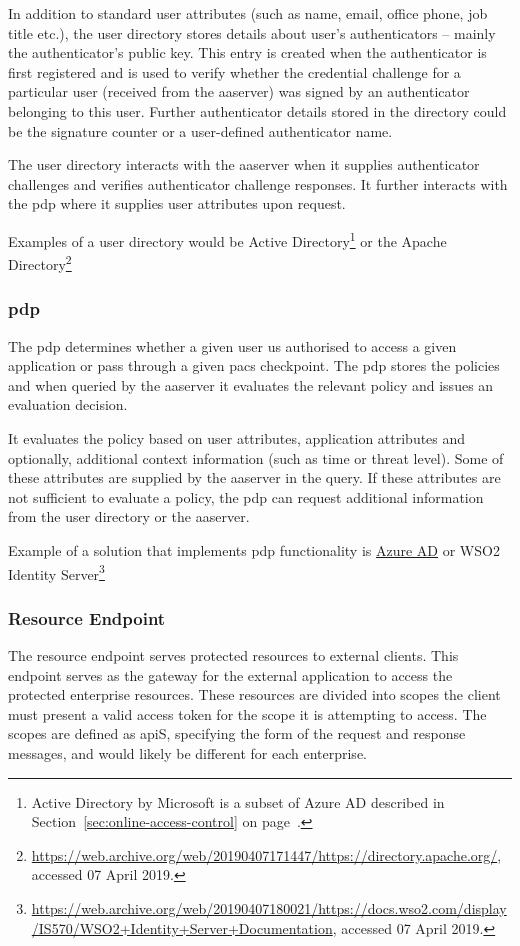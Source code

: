 In addition to standard user attributes (such as name, email, office phone, job title etc.), the user directory stores details about user's authenticators -- mainly the authenticator's public key. This entry is created when the authenticator is first registered and is used to verify whether the credential challenge for a particular user (received from the \acrshort{aaserver}) was signed by an authenticator belonging to this user. Further authenticator details stored in the directory could be the signature counter or a user-defined authenticator name.

The user directory interacts with the \acrshort{aaserver} when it supplies authenticator challenges and verifies authenticator challenge responses. It further interacts with the \acrshort{pdp} where it supplies user attributes upon request.

Examples of a user directory would be Active Directory\footnote{Active Directory by Microsoft is a subset of Azure AD described in Section~\ref{sec:online-access-control} on page~\pageref{sec:online-access-control}.} or the Apache Directory\footnote{\url{https://web.archive.org/web/20190407171447/https://directory.apache.org/}, accessed 07 April 2019.}
    
\subsubsection{\acrlong{pdp}}
The \acrfull{pdp} determines whether a given user us authorised to access a given application or pass through a given \acrshort{pacs} checkpoint. The \acrshort{pdp} stores the policies and when queried by the \acrshort{aaserver} it evaluates the relevant policy and issues an evaluation decision.

It evaluates the policy based on user attributes, application attributes and optionally, additional context information (such as time or threat level). Some of these attributes are supplied by the \acrshort{aaserver} in the query. If these attributes are not sufficient to evaluate a policy, the \acrshort{pdp} can request additional information from the user directory or the \acrshort{aaserver}.

Example of a solution that implements \acrshort{pdp} functionality is \href{sec:online-access-control}{Azure AD} or WSO2 Identity Server\footnote{\url{https://web.archive.org/web/20190407180021/https://docs.wso2.com/display/IS570/WSO2+Identity+Server+Documentation}, accessed 07 April 2019.}
    
\subsubsection{Resource Endpoint}
The resource endpoint serves protected resources to external clients. This endpoint serves as the gateway for the external application to access the protected enterprise resources. These resources are divided into scopes the client must present a valid access token for the scope it is attempting to access. The scopes are defined as \acrshort{api}S, specifying the form of the request and response messages, and would likely be different for each enterprise.
    
